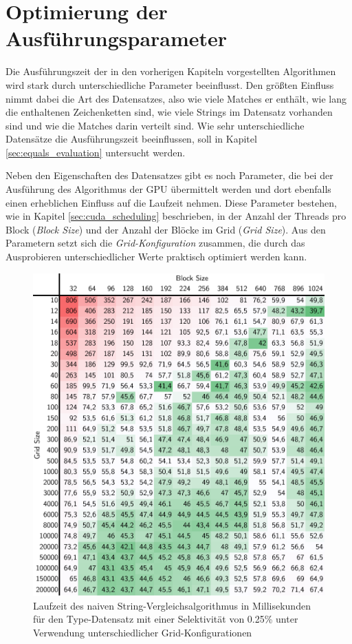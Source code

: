 \chapter{Optimierung der Ausführungsparameter}

Die Ausführungszeit der in den vorherigen Kapiteln vorgestellten Algorithmen wird stark durch unterschiedliche Parameter beeinflusst.
Den größten Einfluss nimmt dabei die Art des Datensatzes, also wie viele Matches er enthält, wie lang die enthaltenen Zeichenketten sind, wie viele Strings im Datensatz vorhanden sind und wie die Matches darin verteilt sind.
Wie sehr unterschiedliche Datensätze die Ausführungszeit beeinflussen, soll in Kapitel \ref{sec:equals_evaluation} untersucht werden.

Neben den Eigenschaften des Datensatzes gibt es noch Parameter, die bei der Ausführung des Algorithmus der GPU übermittelt werden und dort ebenfalls einen erheblichen Einfluss auf die Laufzeit nehmen.
Diese Parameter bestehen, wie in Kapitel \ref{sec:cuda_scheduling} beschrieben, in der Anzahl der Threads pro Block (\emph{Block Size}) und der Anzahl der Blöcke im Grid (\emph{Grid Size}).
Aus den Parametern setzt sich die \emph{Grid-Konfiguration} zusammen, die durch das Ausprobieren unterschiedlicher Werte praktisch optimiert werden kann.

\begin{figure}[ht]
	\includegraphics[]{bilder/parameter025.pdf}
	\caption{Laufzeit des naiven String-Vergleichsalgorithmus in Millisekunden für den Type-Datensatz mit einer Selektivität von 0.25\% unter Verwendung unterschiedlicher Grid-Konfigurationen}
	\label{parameter025}
\end{figure}

